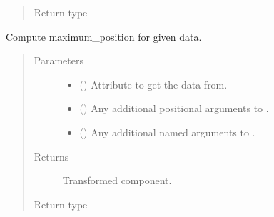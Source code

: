 \documentclass[letterpaper,10pt,english]{sphinxmanual}
\begin{document}
\begin{fulllineitems}
\begin{fulllineitems}
\begin{quote}
\begin{description}
\item[{Return type}] \leavevmode
{\hyperref[\detokenize{api/base_classes:geology.src.base_spatial.SpatialComponent}]{}}

\end{description}\end{quote}

\end{fulllineitems}


\begin{fulllineitems}
\label{\detokenize{api/rock:geology.src.Rock.maximum_position}}
Compute maximum\_position for given data.
\begin{quote}\begin{description}
\item[{Parameters}] \leavevmode\begin{itemize}
\item {} 
 (\sphinxstyleliteralemphasis{\sphinxupquote{, }}) \textendash{} Attribute to get the data from.

\item {} 
 () \textendash{} Any additional positional arguments to .

\item {} 
 () \textendash{} Any additional named arguments to .

\end{itemize}

\item[{Returns}] \leavevmode
{} \textendash{} Transformed component.

\item[{Return type}] \leavevmode
{\hyperref[\detokenize{api/base_classes:geology.src.base_spatial.SpatialComponent}]{}}


\end{description}
\end{quote}
\end{fulllineitems}
\end{fulllineitems}
\end{document}
